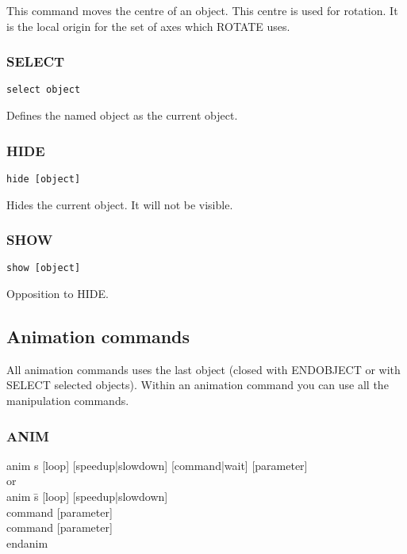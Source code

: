 This command moves the centre of an object. This centre is used for rotation.
It is the local origin for the set of axes which ROTATE uses.

\subsubsection{SELECT}
\tt{select object}

Defines the named object as the current object.

\subsubsection{HIDE}
\tt{hide [object]}

Hides the current object. It will not be visible.

\subsubsection{SHOW}
\tt{show [object]}

Opposition to HIDE.

\subsection{Animation commands}
All animation commands uses the last object (closed with ENDOBJECT or
with SELECT selected objects). Within an animation command you can use
all the manipulation commands.

\subsubsection{ANIM}
\tt{
\begin{tabbing}
anim s [loop] [speedup|slowdown] [command|wait] [parameter] \\
or \\
anim \=s [loop] [speedup|slowdown]\\
\>command [parameter]\\
\>command [parameter]\\
endanim
\end{tabbing}}


